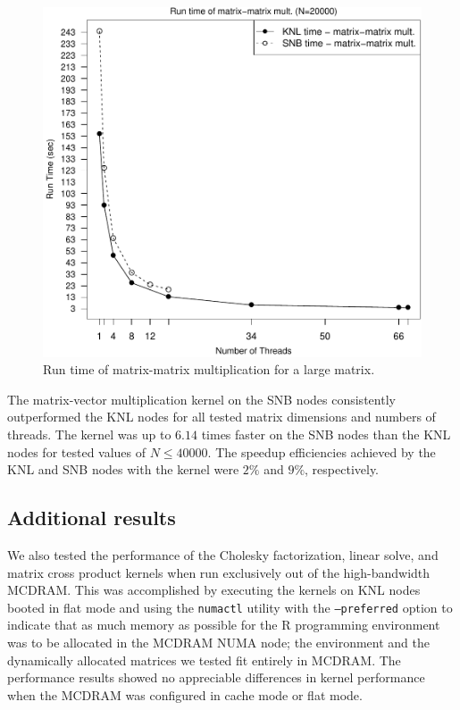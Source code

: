 \begin{figure}
\includegraphics[height=\columnwidth, width=\columnwidth]{matmat_20000_68-rt.pdf}
\caption{Run time of matrix-matrix multiplication for a large matrix.}
\label{fig:largeMatmatTime}
\end{figure}

The matrix-vector multiplication kernel on the SNB nodes consistently outperformed the KNL
nodes for all tested matrix dimensions and numbers of threads. The kernel was up to $6.14$
times faster on the SNB nodes than the KNL nodes for tested values of $N \leq 40000$.
The speedup efficiencies achieved by the KNL and SNB nodes with the kernel were $2\%$ and
$9\%$, respectively.

\subsection{Additional results}

We also tested the performance of the Cholesky factorization, linear solve, and matrix
cross product kernels when run exclusively out of the high-bandwidth MCDRAM. This was
accomplished by executing the kernels on KNL nodes booted in flat mode and using the
\texttt{numactl} utility with the \texttt{--preferred} option to indicate that as much
memory as possible for the R programming environment was to be allocated in the MCDRAM
NUMA node; the environment and the dynamically allocated matrices we tested fit entirely
in MCDRAM. The performance results showed no appreciable differences in kernel performance
when the MCDRAM was configured in cache mode or flat mode.

